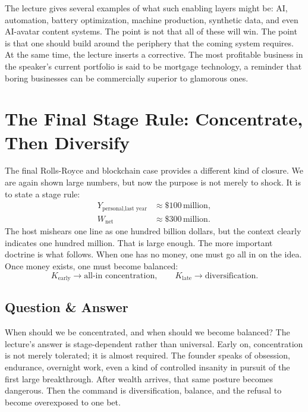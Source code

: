 The lecture gives several examples of what such enabling layers might be: AI, automation, battery optimization, machine production, synthetic data, and even AI-avatar content systems. The point is not that all of these will win. The point is that one should build around the periphery that the coming system requires. At the same time, the lecture inserts a corrective. The most profitable business in the speaker's current portfolio is said to be mortgage technology, a reminder that boring businesses can be commercially superior to glamorous ones.

\section{The Final Stage Rule: Concentrate, Then Diversify}

The final Rolls-Royce and blockchain case provides a different kind of closure. We are again shown large numbers, but now the purpose is not merely to shock. It is to state a stage rule:
\begin{align}
Y_{\text{personal,last year}} &\approx \$100\,\text{million}, \\
W_{\text{net}} &\approx \$300\,\text{million}.
\end{align}
The host mishears one line as one hundred billion dollars, but the context clearly indicates one hundred million. That is large enough. The more important doctrine is what follows. When one has no money, one must go all in on the idea. Once money exists, one must become balanced:
\begin{equation}
K_{\text{early}} \to \text{all-in concentration},
\qquad
K_{\text{late}} \to \text{diversification}.
\end{equation}

\subsection{Question \& Answer}

When should we be concentrated, and when should we become balanced? The lecture's answer is stage-dependent rather than universal. Early on, concentration is not merely tolerated; it is almost required. The founder speaks of obsession, endurance, overnight work, even a kind of controlled insanity in pursuit of the first large breakthrough. After wealth arrives, that same posture becomes dangerous. Then the command is diversification, balance, and the refusal to become overexposed to one bet.

